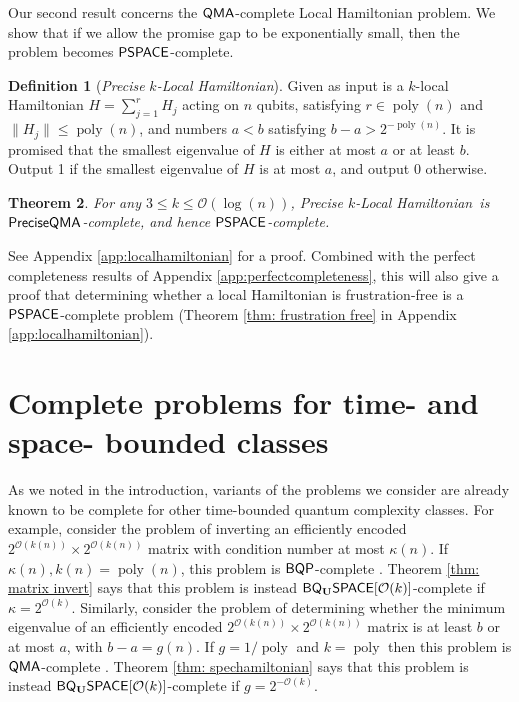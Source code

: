 \documentclass[11pt]{article}
\newtheorem{theorem}{Theorem}
\theoremstyle{definition}
\newtheorem{definition}[theorem]{Definition}
\theoremstyle{remark}
\newcommand\QMA{{\sf{QMA}}}
\newcommand\PSPACE{{\sf{PSPACE}}}
\newcommand\BQP{{\sf{BQP}}}
\newcommand\preciseQMA{{\sf{PreciseQMA}}}
\newcommand\preciseklh{\textit{Precise }$k$\textit{-Local Hamiltonian}}
\newcommand\spechamiltonian[1]{\ensuremath{#1}\textit{-Minimum Eigenvalue}}
\newcommand{\classfont}{\sf}
\newcommand{\Unitary}{\mathbf{U}}
\newcommand{\unitaryBQL}{{\classfont{BQ}_\Unitary\classfont{L}}}
\newcommand{\unitaryBQSPACE}[1]{{\classfont{BQ}_\Unitary\classfont{SPACE}}[#1]}
\newcommand\bigoh{\mathcal{O}}
\DeclareMathOperator{\poly}{poly}
\begin{document}
Our second result concerns the $\QMA$-complete Local Hamiltonian problem. We show that if we allow the promise gap to be exponentially small, then the problem becomes $\PSPACE$-complete. 
\begin{definition}[\preciseklh]\label{def: precise local hamiltonian}
Given as input is a $k$-local Hamiltonian $H=\sum_{j=1}^rH_j$ acting on $n$ qubits, satisfying $r \in \poly(n)$ and $\|H_j\| \le \poly(n)$, and numbers $a < b$ satisfying $b - a > 2^{-\poly(n)}$. It is promised that the smallest eigenvalue of $H$ is either at most $a$ or at least $b$. Output 1 if the smallest eigenvalue of $H$ is at most $a$, and output 0 otherwise.
\end{definition}
\begin{theorem} \label{thm: precise local hamiltonian}
For any $3 \le k \le \mathcal{O}(\log(n))$, \preciseklh \ is $\preciseQMA$-complete, and hence $\PSPACE$-complete.
\end{theorem}
See Appendix \ref{app:localhamiltonian} for a proof. Combined with the perfect completeness results of Appendix \ref{app:perfectcompleteness}, this will also give a proof that determining whether a local Hamiltonian is frustration-free is a $\PSPACE$-complete problem (Theorem \ref{thm: frustration free} in Appendix \ref{app:localhamiltonian}).

\section{Complete problems for time- and space- bounded classes} \label{sec: time and space}
As we noted in the introduction, variants of the problems we consider are already known to be complete for other time-bounded quantum complexity classes. 
For example, consider the problem of inverting an efficiently encoded $2^{\bigoh(k(n))} \times 2^{\bigoh(k(n))}$ matrix with condition number at most $\kappa(n)$. If $\kappa(n), k(n) = \poly(n)$, this problem is $\BQP$-complete \cite{HHL}. Theorem \ref {thm: matrix invert} says that this problem is instead $\unitaryBQSPACE{\bigoh(k)}$-complete if $\kappa = 2^{\bigoh(k)}$. %
Similarly, consider the problem of determining whether the minimum eigenvalue of an efficiently encoded $2^{\bigoh(k(n))} \times 2^{\bigoh(k(n))}$ matrix is at least $b$ or at most $a$, with $b-a=g(n)$. If $g = 1/\poly$ and $k = \poly$ then this problem is $\QMA$-complete \cite{ksv02,at03}. Theorem \ref{thm: spechamiltonian} says that this problem is instead $\unitaryBQSPACE{\bigoh(k)}$-complete if $g = 2^{-\bigoh(k)}$. %
\end{document}
